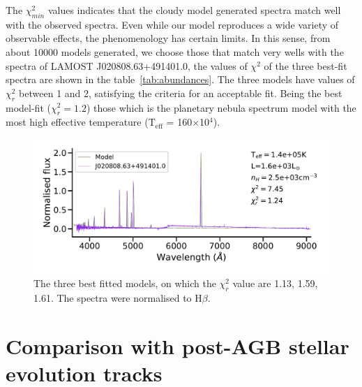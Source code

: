 \documentclass[fleqn,usenatbib]{mnras}
\begin{document}
{The $\chi^{2}_{min}$
  values indicates
that the {\sc cloudy} model generated spectra match well with
the observed spectra. Even while our model reproduces a wide variety
of observable effects, the phenomenology has certain limits.
In this sense, from about 10000 models generated, we choose those that
match very wells with the spectra of  LAMOST J020808.63+491401.0,
the values of $\chi^{2}$  of the three best-fit spectra
are shown in the table~\ref{tab:abundances}. The three
models have values of $\chi^{2}_{r}$ between 1 and 2, satisfying
the criteria for an acceptable fit. Being the best model-fit ($\chi^{2}_{r} = 1.2$)
those which is the  planetary nebula spectrum model with the
most high effective temperature (T$_{\text{eff}}$ = 160$\times$10$^{4}$).

\begin{figure}
\centering
\includegraphics[width=\linewidth, trim=10 90 10 10, clip]{Figs/model_140000_36.79_3.40.pdf}
\caption{The three best fitted models, on which the $\chi^2_r$ value are 1.13, 1.59, 1.61.
  The spectra were normalised to H{$\beta$}.} 
  \label{fig:spectra-obs-model}
\end{figure}

\section{Comparison with post-AGB stellar evolution tracks}
\label{sec:tracks}

}
\end{document}
